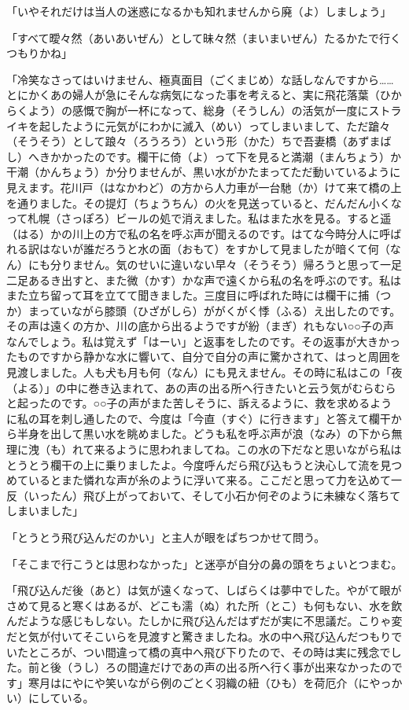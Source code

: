 \documentclass{book}
\begin{document}
「いやそれだけは当人の迷惑になるかも知れませんから廃（よ）しましょう」

「すべて曖々然（あいあいぜん）として昧々然（まいまいぜん）たるかたで行くつもりかね」

「冷笑なさってはいけません、極真面目（ごくまじめ）な話しなんですから\ldots{}\ldots{}とにかくあの婦人が急にそんな病気になった事を考えると、実に飛花落葉（ひからくよう）の感慨で胸が一杯になって、総身（そうしん）の活気が一度にストライキを起したように元気がにわかに滅入（めい）ってしまいまして、ただ蹌々（そうそう）として踉々（ろうろう）という形（かた）ちで吾妻橋（あずまばし）へきかかったのです。欄干に倚（よ）って下を見ると満潮（まんちょう）か干潮（かんちょう）か分りませんが、黒い水がかたまってただ動いているように見えます。花川戸（はなかわど）の方から人力車が一台馳（か）けて来て橋の上を通りました。その提灯（ちょうちん）の火を見送っていると、だんだん小くなって札幌（さっぽろ）ビールの処で消えました。私はまた水を見る。すると遥（はる）かの川上の方で私の名を呼ぶ声が聞えるのです。はてな今時分人に呼ばれる訳はないが誰だろうと水の面（おもて）をすかして見ましたが暗くて何（なん）にも分りません。気のせいに違いない早々（そうそう）帰ろうと思って一足二足あるき出すと、また微（かす）かな声で遠くから私の名を呼ぶのです。私はまた立ち留って耳を立てて聞きました。三度目に呼ばれた時には欄干に捕（つか）まっていながら膝頭（ひざがしら）ががくがく悸（ふる）え出したのです。その声は遠くの方か、川の底から出るようですが紛（まぎ）れもない○○子の声なんでしょう。私は覚えず「はーい」と返事をしたのです。その返事が大きかったものですから静かな水に響いて、自分で自分の声に驚かされて、はっと周囲を見渡しました。人も犬も月も何（なん）にも見えません。その時に私はこの「夜（よる）」の中に巻き込まれて、あの声の出る所へ行きたいと云う気がむらむらと起ったのです。○○子の声がまた苦しそうに、訴えるように、救を求めるように私の耳を刺し通したので、今度は「今直（すぐ）に行きます」と答えて欄干から半身を出して黒い水を眺めました。どうも私を呼ぶ声が浪（なみ）の下から無理に洩（も）れて来るように思われましてね。この水の下だなと思いながら私はとうとう欄干の上に乗りましたよ。今度呼んだら飛び込もうと決心して流を見つめているとまた憐れな声が糸のように浮いて来る。ここだと思って力を込めて一反（いったん）飛び上がっておいて、そして小石か何ぞのように未練なく落ちてしまいました」

「とうとう飛び込んだのかい」と主人が眼をぱちつかせて問う。

「そこまで行こうとは思わなかった」と迷亭が自分の鼻の頭をちょいとつまむ。

「飛び込んだ後（あと）は気が遠くなって、しばらくは夢中でした。やがて眼がさめて見ると寒くはあるが、どこも濡（ぬ）れた所（とこ）も何もない、水を飲んだような感じもしない。たしかに飛び込んだはずだが実に不思議だ。こりゃ変だと気が付いてそこいらを見渡すと驚きましたね。水の中へ飛び込んだつもりでいたところが、つい間違って橋の真中へ飛び下りたので、その時は実に残念でした。前と後（うし）ろの間違だけであの声の出る所へ行く事が出来なかったのです」寒月はにやにや笑いながら例のごとく羽織の紐（ひも）を荷厄介（にやっかい）にしている。
\end{document}
